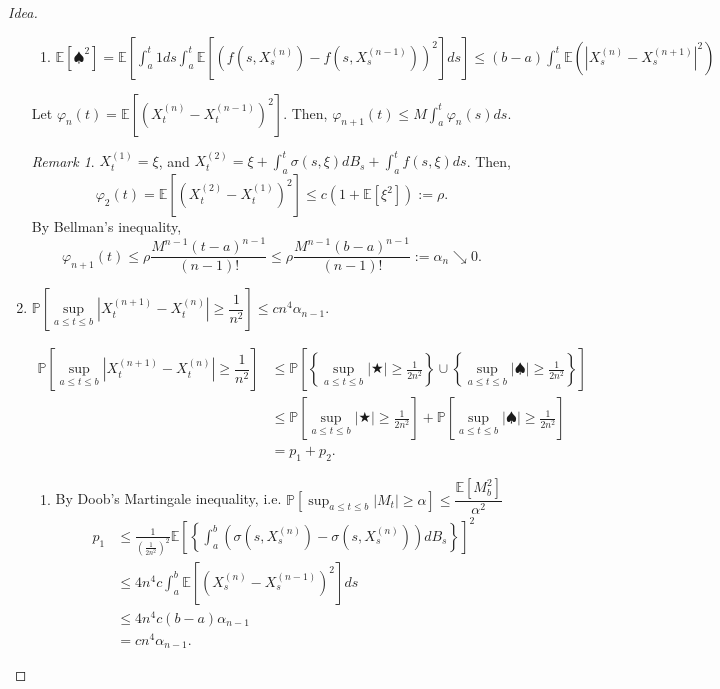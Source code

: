 \documentclass[12pt]{report}
\renewcommand{\P}{\mathbb{P}}
\newcommand{\E}{\mathbb{E}}
\renewcommand{\1}{\mathbb{1}}
\theoremstyle{break}
\theoremstyle{newdef}
\theoremstyle{remark}
\newtheorem*{rem}{Remark} %
\begin{document}
\begin{proof}[Idea]
\begin{enumerate}[wide]
\begin{enumerate}[wide]
\item
$\E[\spadesuit^2]
= \E\left[\int_a^t 1ds \int_a^t \E\left[ \left( f(s,X_s^{(n)}) - f(s,X_s^{(n-1)}) \right)^2 \right]ds\right]
\leq (b-a)\int_a^t \E\left(|X_s^{(n)} - X_s^{(n+1)}|^2\right)$
\end{enumerate}
Let $\varphi_n(t) = \E\left[ \left( X_t^{(n)} - X_t^{(n-1)} \right)^2 \right]$.
Then, $\varphi_{n+1}(t) \leq M \int_a^t \varphi_n(s)ds$.

\begin{rem}
$X_t^{(1)} = \xi$, and $X_t^{(2)} = \xi + \int_a^t \sigma(s,\xi)dB_s + \int_a^t f(s,\xi)ds$.
Then,
$$\varphi_2(t) = \E[(X_t^{(2)} - X_t^{(1)})^2] \leq c(1 + \E[\xi^2]) := \rho.$$
By Bellman's inequality,
$$
\varphi_{n+1}(t) \leq \rho \frac{M^{n-1}(t-a)^{n-1}}{(n-1)!} \leq  \rho \frac{M^{n-1}(b-a)^{n-1}}{(n-1)!}  := \alpha_n \searrow 0.
$$
\end{rem}

\item
$\P\left[ \sup\limits_{a\leq t \leq b} \left|X_t^{(n+1)} - X_t^{(n)}\right| \geq \dfrac{1}{n^2} \right] \leq cn^4 \alpha_{n-1}$.

$$
\begin{aligned}
\P\left[ \sup\limits_{a\leq t \leq b} \left|X_t^{(n+1)} - X_t^{(n)}\right| \geq \dfrac{1}{n^2} \right]
&\leq \P\left[\left\{\sup_{a \leq t \leq b}|\bigstar| \geq \frac{1}{2n^2}\right\} \cup \left\{ \sup_{a \leq t \leq b}|\spadesuit| \geq \frac{1}{2n^2} \right\} \right]\\
& \leq \P\left[\sup_{a \leq t \leq b}|\bigstar| \geq \frac{1}{2n^2}\right] + \P\left[ \sup_{a \leq t \leq b}|\spadesuit| \geq \frac{1}{2n^2} \right]\\
&= p_1+ p_2.
\end{aligned}
$$

\begin{enumerate}[wide]
\item
By Doob's Martingale inequality, i.e. $\P[\sup_{a\leq t\leq b}|M_t| \geq \alpha] \leq \dfrac{ \E[M_b^2] }{\alpha^2}$
$$
\begin{aligned}
p_1 &\leq \frac{1}{(\frac{1}{2n^2})^2}\E\left[ \left\{ \int_a^b \left( \sigma(s,X_s^{(n)}) - \sigma(s,X_s^{(n)}) \right) dB_s \right\} \right]^2\\
&\leq 4n^4 c \int_a^b \E\left[\left( X_s^{(n)} - X_s^{(n-1)} \right)^2\right]ds\\
&\leq 4n^4c (b-a)\alpha_{n-1}\\
&= c n^4 \alpha_{n-1}.
\end{aligned}
$$


\end{enumerate}
\end{enumerate}
\end{proof}
\end{document}
